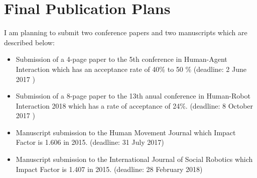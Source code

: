 \documentclass{sigchi}
\begin{document}
\section{Final Publication Plans}
I am planning to submit two conference papers and two manuscripts which
are described below:
\begin{itemize}
  \setlength{\itemsep}{0pt}
  \setlength{\parskip}{0pt}
  \item Submission of a 4-page paper to the 5th conference in Human-Agent
  Interaction which has an acceptance rate of 40\% to 50 \% (deadline: 2 June 2017 )
  \item Submission of a 8-page paper to the 13th anual conference in Human-Robot
  Interaction 2018 which has a rate of acceptance of 24\%. (deadline: 8 October 2017 )
  \item Manuscript submission to the Human Movement Journal which Impact Factor
  is 1.606 in 2015. (deadline: 31 July 2017)
  \item Manuscript submission to the International Journal of Social Robotics
  which Impact Factor is 1.407 in 2015. (deadline: 28 February 2018)
\end{itemize}









\end{document}
